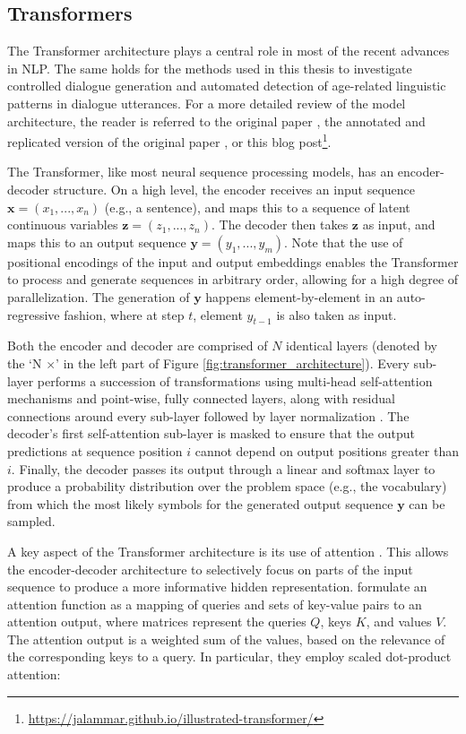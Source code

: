 \subsection{Transformers}

The Transformer architecture plays a central role in most of the recent advances in NLP. The same holds for the methods used in this thesis to investigate controlled dialogue generation and automated detection of age-related linguistic patterns in dialogue utterances. For a more detailed review of the model architecture, the reader is referred to the original paper \citep{vaswani2017attention}, the annotated and replicated version of the original paper \citep{rush-2018-annotated}, or this blog post\footnote{\url{https://jalammar.github.io/illustrated-transformer/}}.

The Transformer, like most neural sequence processing models, has an encoder-decoder structure. On a high level, the encoder receives an input sequence $\textbf{x} = (x_1, ..., x_n)$ (e.g., a sentence), and maps this to a sequence of latent continuous variables $\textbf{z} = (z_1, ..., z_n)$. The decoder then takes $\textbf{z}$ as input, and maps this to an output sequence $\textbf{y} = (y_1, ..., y_m)$. Note that the use of positional encodings of the input and output embeddings enables the Transformer to process and generate sequences in arbitrary order, allowing for a high degree of parallelization. The generation of $\textbf{y}$ happens element-by-element in an auto-regressive fashion, where at step $t$, element $y_{t - 1}$ is also taken as input.

Both the encoder and decoder are comprised of $N$ identical layers (denoted by the `N $\times$' in the left part of Figure \ref{fig:transformer_architecture}). Every sub-layer performs a succession of transformations using multi-head self-attention mechanisms and point-wise, fully connected layers, along with residual connections \citep{he2016residual} around every sub-layer followed by layer normalization \citep{DBLP:journals/corr/BaKH16}. The decoder's first self-attention sub-layer is masked to ensure that the output predictions at sequence position $i$ cannot depend on output positions greater than $i$. Finally, the decoder passes its output through a linear and softmax layer to produce a probability distribution over the problem space (e.g., the vocabulary) from which the most likely symbols for the generated output sequence $\textbf{y}$ can be sampled.

A key aspect of the Transformer architecture is its use of attention \citep{DBLP:journals/corr/BahdanauCB14}. This allows the encoder-decoder architecture to selectively focus on parts of the input sequence to produce a more informative hidden representation. \cite{vaswani2017attention} formulate an attention function as a mapping of queries and sets of key-value pairs to an attention output, where matrices represent the queries $Q$, keys $K$, and values $V$. The attention output is a weighted sum of the values, based on the relevance of the corresponding keys to a query. In particular, they employ scaled dot-product attention:

